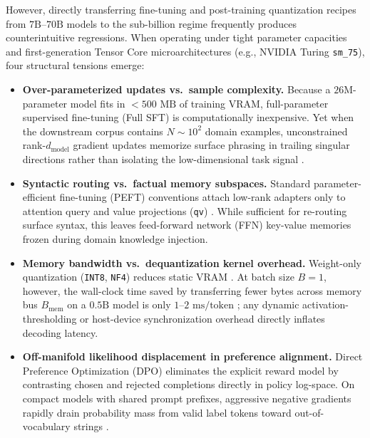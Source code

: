 \documentclass[10pt,a4paper,twocolumn]{article}
\begin{document}
However, directly transferring fine-tuning and post-training quantization recipes from $7\text{B}$--$70\text{B}$ models to the sub-billion regime frequently produces counterintuitive regressions. When operating under tight parameter capacities and first-generation Tensor Core microarchitectures (e.g., NVIDIA Turing \texttt{sm\_75}), four structural tensions emerge:
\begin{itemize}\setlength{\itemsep}{1.5pt}\setlength{\parskip}{0pt}\setlength{\topsep}{3pt}
  \item \textbf{Over-parameterized updates vs.\ sample complexity.} Because a $26\text{M}$-parameter model fits in $<500\text{ MB}$ of training VRAM, full-parameter supervised fine-tuning (Full SFT) is computationally inexpensive. Yet when the downstream corpus contains $N \sim 10^2$ domain examples, unconstrained rank-$d_{\text{model}}$ gradient updates memorize surface phrasing in trailing singular directions rather than isolating the low-dimensional task signal \citep{aghajanyan2021intrinsic,hu2022lora}.
  \item \textbf{Syntactic routing vs.\ factual memory subspaces.} Standard parameter-efficient fine-tuning (PEFT) conventions attach low-rank adapters only to attention query and value projections (\texttt{qv}) \citep{hu2022lora}. While sufficient for re-routing surface syntax, this leaves feed-forward network (FFN) key-value memories \citep{geva2021transformer,meng2022locating} frozen during domain knowledge injection.
  \item \textbf{Memory bandwidth vs.\ dequantization kernel overhead.} Weight-only quantization (\texttt{INT8}, \texttt{NF4}) reduces static VRAM \citep{dettmers2022llm,dettmers2023qlora}. At batch size $B=1$, however, the wall-clock time saved by transferring fewer bytes across memory bus $B_{\text{mem}}$ on a $0.5\text{B}$ model is only $1$--$2\text{ ms/token}$ \citep{williams2009roofline}; any dynamic activation-thresholding or host-device synchronization overhead directly inflates decoding latency.
  \item \textbf{Off-manifold likelihood displacement in preference alignment.} Direct Preference Optimization (DPO) \citep{rafailov2023direct} eliminates the explicit reward model by contrasting chosen and rejected completions directly in policy log-space. On compact models with shared prompt prefixes, aggressive negative gradients rapidly drain probability mass from valid label tokens toward out-of-vocabulary strings \citep{pal2024smaug,tajwar2024preference}.
\end{itemize}
\end{document}

